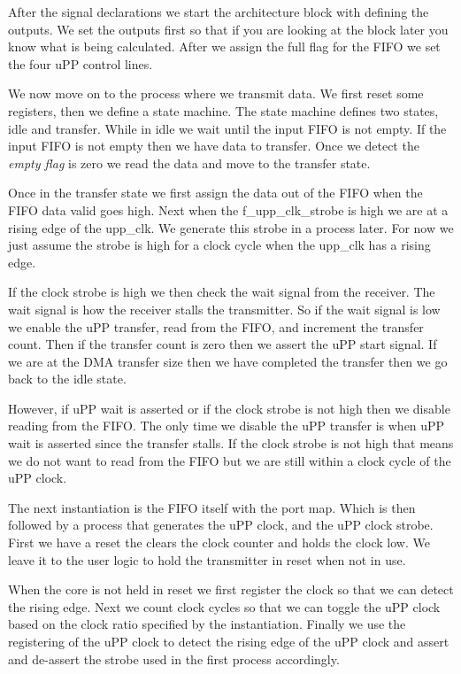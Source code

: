 After the signal declarations we start the architecture block with defining the outputs. We set the outputs first so that if you are looking at the block later you know what is being calculated. After we assign the full flag for the \ac{FIFO} we set the four \ac{uPP} control lines. 

We now move on to the process where we transmit data. We first reset some registers, then we define a state machine. The state machine defines two states, idle and transfer. While in idle we wait until the input \ac{FIFO} is not empty. If the input \ac{FIFO} is not empty then we have data to transfer. Once we detect the \emph{empty flag} is zero we read the data and move to the transfer state. 

Once in the transfer state we first assign the data out of the \ac{FIFO} when the \ac{FIFO} data valid goes high. Next when the f\_upp\_clk\_strobe is high we are at a rising edge of the upp\_clk. We generate this strobe in a process later. For now we just assume the strobe is high for a clock cycle when the upp\_clk has a rising edge. 

If the clock strobe is high we then check the wait signal from the receiver. The wait signal is how the receiver stalls the transmitter. So if the wait signal is low we enable the \ac{uPP} transfer, read from the \ac{FIFO}, and increment the transfer count. Then if the transfer count is zero then we assert the \ac{uPP} start signal. If we are at the \ac{DMA} transfer size then we have completed the transfer then we go back to the idle state. 

However, if \ac{uPP} wait is asserted or if the clock strobe is not high then we disable reading from the \ac{FIFO}. The only time we disable the \ac{uPP} transfer is when \ac{uPP} wait is asserted since the transfer stalls. If the clock strobe is not high that means we do not want to read from the \ac{FIFO} but we are still within a clock cycle of the \ac{uPP} clock. 

The next instantiation is the \ac{FIFO} itself with the port map. Which is then followed by a process that generates the \ac{uPP} clock, and the \ac{uPP} clock strobe. First we have a reset the clears the clock counter and holds the clock low. We leave it to the user logic to hold the transmitter in reset when not in use. 

When the core is not held in reset we first register the clock so that we can detect the rising edge. Next we count clock cycles so that we can toggle the \ac{uPP} clock based on the clock ratio specified by the instantiation. Finally we use the registering of the \ac{uPP} clock to detect the rising edge of the \ac{uPP} clock and assert and de-assert the strobe used in the first process accordingly.

